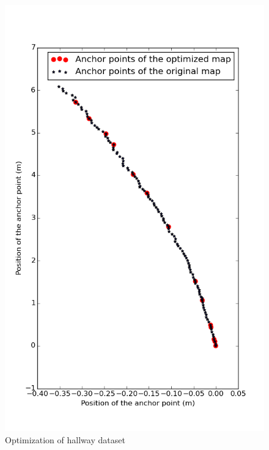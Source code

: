 \documentclass[letterpaper,10 pt,conference]{ieeeconf}
\begin{document}
\begin{figure}
  \centering
  \includegraphics[scale=0.5]{hallway_optimization}
  \caption{Optimization of hallway dataset}
\end{figure}
\end{document}
